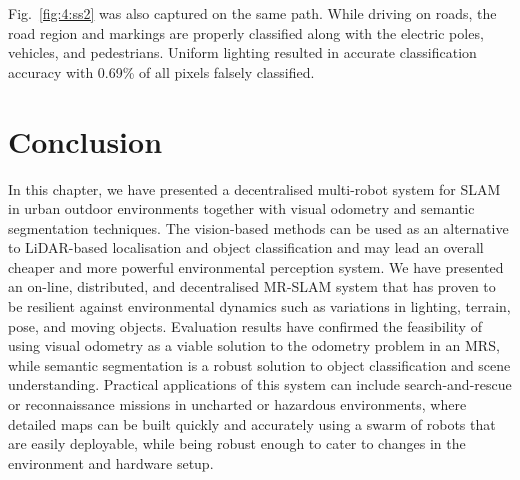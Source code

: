 Fig.~\ref{fig:4:ss2} was also captured on the same path. While driving on roads, the road region and markings are properly classified along with the electric poles, vehicles, and pedestrians. Uniform lighting resulted in accurate classification accuracy with 0.69\% of all pixels falsely classified.

\section{Conclusion}
In this chapter, we have presented a decentralised multi-robot system for SLAM in urban outdoor environments together with visual odometry and semantic segmentation techniques. The vision-based methods can be used as an alternative to LiDAR-based localisation and object classification and may lead an overall cheaper and more powerful environmental perception system. We have presented an on-line, distributed, and decentralised MR-SLAM system that has proven to be resilient against environmental dynamics such as variations in lighting, terrain, pose, and moving objects. Evaluation results have confirmed the feasibility of using visual odometry as a viable solution to the odometry problem in an MRS, while semantic segmentation is a robust solution to object classification and scene understanding. Practical applications of this system can include search-and-rescue or reconnaissance missions in uncharted or hazardous environments, where detailed maps can be built quickly and accurately using a swarm of robots that are easily deployable, while being robust enough to cater to changes in the environment and hardware setup.